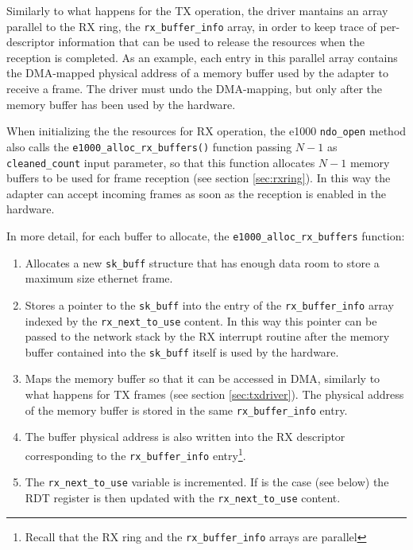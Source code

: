 \vspace{0.5cm}

Similarly to what happens for the TX operation, the driver mantains an array parallel to the RX ring, the \texttt{rx\_buffer\_info} array,
in order to keep trace of per-descriptor information that can be used to release the resources when the reception is completed.
As an example, each entry in this parallel array contains the DMA-mapped physical address of a memory buffer used by the adapter to
receive a frame. The driver must undo the DMA-mapping, but only after the memory buffer has been used by the hardware.

\vspace{0.5cm}

When initializing the the resources for RX operation, the e1000 \texttt{ndo\_open} method also calls the \texttt{e1000\_alloc\_rx\_buffers()}
function passing $N-1$ as \texttt{cleaned\_count} input parameter, so that this function allocates $N-1$ memory buffers to be used for frame 
reception (see section \ref{sec:rxring}). In this way the adapter can accept incoming frames as soon as the reception is enabled in the 
hardware.

\vspace{0.5cm}

In more detail, for each buffer to allocate, the \texttt{e1000\_alloc\_rx\_buffers} function:
\begin{enumerate}
    \item Allocates a new \texttt{sk\_buff} structure that has enough data room to store a maximum size ethernet frame.
    
    \item Stores a pointer to the \texttt{sk\_buff} into the entry of the \texttt{rx\_buffer\_info} array indexed by the 
	  \texttt{rx\_next\_to\_use} content. In this way this pointer can be
	  passed to the network stack by the RX interrupt routine after the memory buffer contained into the \texttt{sk\_buff} itself
	  is used by the hardware.
	  
    \item Maps the memory buffer so that it can be accessed in DMA, similarly to what happens for TX frames (see section 
	  \ref{sec:txdriver}). The physical address of the memory buffer is stored in the same \texttt{rx\_buffer\_info} entry.
	  
    \item The buffer physical address is also written into the RX descriptor corresponding to the \texttt{rx\_buffer\_info} 
	  entry\footnote{Recall that the RX ring and the \texttt{rx\_buffer\_info} arrays are parallel}.
	  
    \item The \texttt{rx\_next\_to\_use} variable is incremented. If is the case (see below) the RDT register is then updated with the 
	  \texttt{rx\_next\_to\_use} content.
\end{enumerate}

